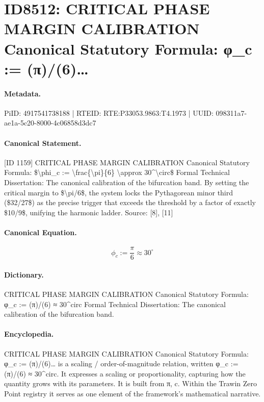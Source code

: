 \section*{ID8512: CRITICAL PHASE MARGIN CALIBRATION Canonical Statutory Formula: φ\_c := (π)/(6)…}
\paragraph{Metadata.}
PiID: 4917541738188 | RTEID: RTE:P33053.9863:T4.1973 | UUID: 098311a7-ae1a-5c20-8000-4c06858d3dc7

\paragraph{Canonical Statement.}
[ID 1159] CRITICAL PHASE MARGIN CALIBRATION Canonical Statutory Formula: \$\textbackslash{}phi\_c := \textbackslash{}frac\{\textbackslash{}pi\}\{6\} \textbackslash{}approx 30\textasciicircum{}\textbackslash{}circ\$ Formal Technical Dissertation: The canonical calibration of the bifurcation band. By setting the critical margin to \$\textbackslash{}pi/6\$, the system locks the Pythagorean minor third (\$32/27\$) as the precise trigger that exceeds the threshold by a factor of exactly \$10/9\$, unifying the harmonic ladder. Source: [8], [11]

\paragraph{Canonical Equation.}
\[
\phi_c := \frac{\pi}{6} \approx 30^\circ
\]

\paragraph{Dictionary.}
CRITICAL PHASE MARGIN CALIBRATION Canonical Statutory Formula: φ\_c := (π)/(6) ≈ 30\textasciicircum{}circ Formal Technical Dissertation: The canonical calibration of the bifurcation band.

\paragraph{Encyclopedia.}
CRITICAL PHASE MARGIN CALIBRATION Canonical Statutory Formula: φ\_c := (π)/(6)… is a scaling / order-of-magnitude relation, written φ\_c := (π)/(6) ≈ 30\textasciicircum{}circ. It expresses a scaling or proportionality, capturing how the quantity grows with its parameters. It is built from π, c. Within the Trawin Zero Point registry it serves as one element of the framework's mathematical narrative.
